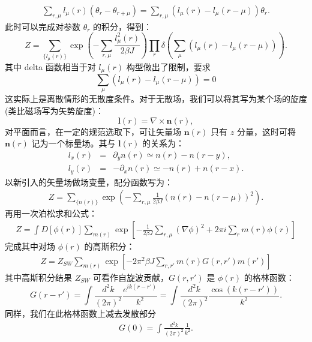 \documentclass[10pt,UTF8]{ctexart}
\begin{document}
\begin{eqnarray}
	\sum_{r,\mu} l_\mu(r)(\theta_r - \theta_{r+\mu})
	= \sum_{r,\mu} (l_\mu(r)-l_\mu(r-\mu))\theta_r.
\end{eqnarray}
此时可以完成对参数 $\theta_r$ 的积分，得到：
\begin{equation}
	Z = \sum_{\{l_\mu(r)\}}\exp\left(-\sum_{r,\mu}\frac{l_\mu^2(r)}{2\beta J}\right)\prod_r \delta\left(\sum_\mu (l_\mu(r)-l_\mu(r-\mu))\right).
\end{equation}
其中 delta 函数相当于对 $l_\mu(r)$ 构型做出了限制，要求
\begin{equation}
	\sum_\mu (l_\mu(r)-l_\mu(r-\mu)) = 0
\end{equation}
这实际上是离散情形的无散度条件。对于无散场，我们可以将其写为某个场的旋度(类比磁场写为矢势旋度)：
\begin{equation}
	\bm l(r) = \nabla \times \bm n(r),
\end{equation}
对平面而言，在一定的规范选取下，可让矢量场 $\bm n(r)$ 只有 $z$ 分量，这时可将 $\bm n(r)$ 记为一个标量场。其与 $\bm l(r)$ 的关系为：
\begin{eqnarray}
	l_x(r) &=& \partial_y n(r) \simeq n(r) - n(r-y), \nonumber \\
	l_y(r) &=& -\partial_x n(r) \simeq -n(r) + n(r-x).
\end{eqnarray}
以新引入的矢量场做场变量，配分函数写为：
\begin{eqnarray}
	Z = \sum_{\{n(r)\}}\exp\left(-\sum_{r,\mu}\frac{1}{2\beta J} (n(r)-n(r-\mu))^2 \right).
\end{eqnarray}
再用一次泊松求和公式：
\begin{eqnarray}
	Z = \int D[\phi(r)] \sum_{m(r)} \exp\left[-\frac{1}{2 \beta J}\sum_{r,\mu} (\nabla \phi)^2 + 2\pi i\sum_r m(r) \phi(r)\right]
\end{eqnarray}
完成其中对场 $\phi(r)$ 的高斯积分：
\begin{eqnarray}
	Z = Z_{SW}\sum_{m(r)} \exp\left[-2\pi^2 \beta J \sum_{r,r'}m(r) G(r,r') m(r')\right]
\end{eqnarray}
其中高斯积分结果 $Z_{SW}$ 可看作自旋波贡献，$G(r,r')$ 是 $\phi(r)$ 的格林函数：
\begin{equation}
	G(r-r') = \int \frac{d^2 k}{(2\pi)^2} \frac{e^{i k (r-r')}}{k^2}
			= \int \frac{d^2 k}{(2\pi)^2} \frac{\cos(k(r-r'))}{k^2}.
\end{equation}
同样，我们在此格林函数上减去发散部分
\begin{eqnarray}
	G(0) = \int \frac{d^2 k}{(2\pi)^2} \frac{1}{k^2}.
\end{eqnarray}
\end{document}
